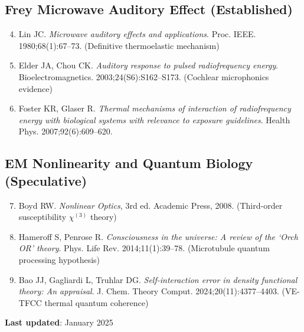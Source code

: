 \subsection*{Frey Microwave Auditory Effect (Established)}

\begin{enumerate}
\setcounter{enumi}{3}
\item Lin JC. \textit{Microwave auditory effects and applications}. Proc. IEEE. 1980;68(1):67--73. (Definitive thermoelastic mechanism)

\item Elder JA, Chou CK. \textit{Auditory response to pulsed radiofrequency energy}. Bioelectromagnetics. 2003;24(S6):S162--S173. (Cochlear microphonics evidence)

\item Foster KR, Glaser R. \textit{Thermal mechanisms of interaction of radiofrequency energy with biological systems with relevance to exposure guidelines}. Health Phys. 2007;92(6):609--620.
\end{enumerate}

\subsection*{EM Nonlinearity and Quantum Biology (Speculative)}

\begin{enumerate}
\setcounter{enumi}{6}
\item Boyd RW. \textit{Nonlinear Optics}, 3rd ed. Academic Press, 2008. (Third-order susceptibility $\chi^{(3)}$ theory)

\item Hameroff S, Penrose R. \textit{Consciousness in the universe: A review of the `Orch OR' theory}. Phys. Life Rev. 2014;11(1):39--78. (Microtubule quantum processing hypothesis)

\item Bao JJ, Gagliardi L, Truhlar DG. \textit{Self-interaction error in density functional theory: An appraisal}. J. Chem. Theory Comput. 2024;20(11):4377--4403. (VE-TFCC thermal quantum coherence)
\end{enumerate}

\vspace{1em}
\noindent\textbf{Last updated}: January 2025
